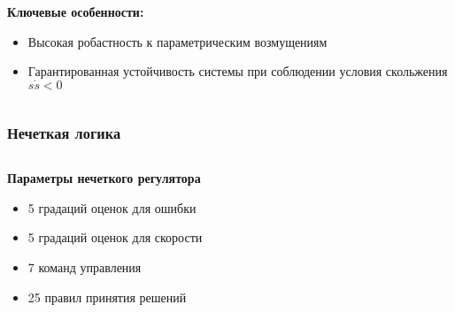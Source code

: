 \begin{frame}
\begin{columns}[t]
		\begin{block}{\scriptsize\textbf{Ключевые особенности:}}
			\begin{itemize}
				\item Высокая робастность к параметрическим возмущениям
				\item Гарантированная устойчивость системы при соблюдении условия скольжения $s\dot{s} < 0$
			\end{itemize}
		\end{block}

	\end{columns}

\end{frame}

\begin{frame}
	\frametitle{Нечеткая логика}

	\scriptsize
	\begin{columns}[T]
		\begin{column}{0.48\textwidth}



			\begin{block}{\textbf {\scriptsize Параметры нечеткого регулятора}}
				\begin{itemize}
					\item 5 градаций оценок для ошибки
					\item 5 градаций оценок для скорости
					\item 7 команд управления
					\item 25 правил принятия решений
				\end{itemize}
			\end{block}


\end{column}
\end{columns}
\end{frame}
